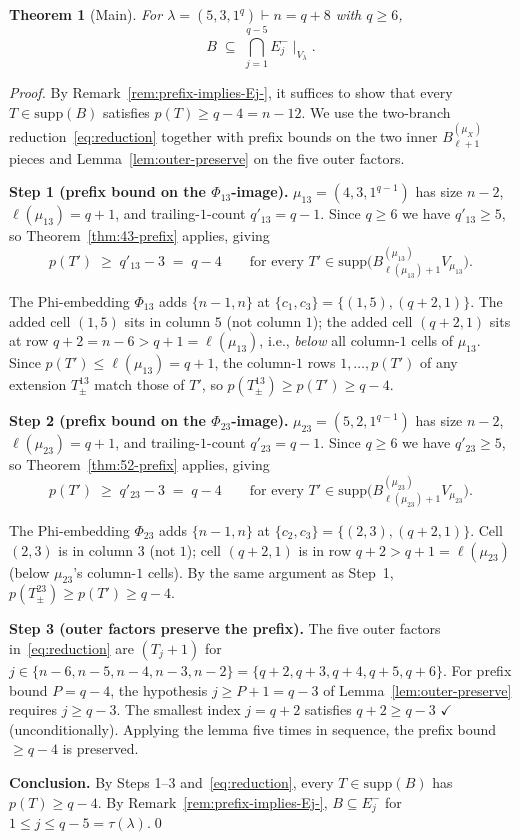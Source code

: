 \documentclass[11pt]{article}
\newtheorem{theorem}{Theorem}
\theoremstyle{definition}
\newcommand{\supp}{\mathrm{supp}}
\begin{document}
\begin{theorem}[Main]\label{thm:main}
For $\lambda = (5, 3, 1^q) \vdash n = q + 8$ with $q \ge 6$,
\[
   B \;\subseteq\; \bigcap_{j=1}^{q-5} E_j^-\!\mid_{V_\lambda}.
\]
\end{theorem}

\begin{proof}
By Remark~\ref{rem:prefix-implies-Ej-}, it suffices to show that every
$T \in \supp(B)$ satisfies $p(T) \ge q - 4 = n - 12$.  We use the
two-branch reduction~\eqref{eq:reduction} together with prefix bounds
on the two inner $B^{(\mu_X)}_{\ell+1}$ pieces and
Lemma~\ref{lem:outer-preserve} on the five outer factors.

\medskip\textbf{Step 1 (prefix bound on the $\Phi_{13}$-image).}
$\mu_{13} = (4, 3, 1^{q-1})$ has size $n - 2$, $\ell(\mu_{13}) =
q + 1$, and trailing-$1$-count $q'_{13} = q - 1$.  Since $q \ge 6$ we
have $q'_{13} \ge 5$, so Theorem~\ref{thm:43-prefix} applies, giving
\[
   p(T') \;\ge\; q'_{13} - 3 \;=\; q - 4
   \qquad \text{for every }
   T' \in \supp\bigl(B^{(\mu_{13})}_{\ell(\mu_{13})+1} V_{\mu_{13}}\bigr).
\]

The Phi-embedding $\Phi_{13}$ adds $\{n-1, n\}$ at $\{c_1, c_3\} =
\{(1, 5), (q+2, 1)\}$.  The added cell $(1, 5)$ sits in column $5$
(not column $1$); the added cell $(q+2, 1)$ sits at row $q + 2 = n - 6
> q + 1 = \ell(\mu_{13})$, i.e., \emph{below} all column-$1$ cells of
$\mu_{13}$.  Since $p(T') \le \ell(\mu_{13}) = q + 1$, the column-$1$
rows $1, \ldots, p(T')$ of any extension $T^{13}_\pm$ match those of
$T'$, so $p(T^{13}_\pm) \ge p(T') \ge q - 4$.

\medskip\textbf{Step 2 (prefix bound on the $\Phi_{23}$-image).}
$\mu_{23} = (5, 2, 1^{q-1})$ has size $n - 2$, $\ell(\mu_{23}) =
q + 1$, and trailing-$1$-count $q'_{23} = q - 1$.  Since $q \ge 6$ we
have $q'_{23} \ge 5$, so Theorem~\ref{thm:52-prefix} applies, giving
\[
   p(T') \;\ge\; q'_{23} - 3 \;=\; q - 4
   \qquad \text{for every }
   T' \in \supp\bigl(B^{(\mu_{23})}_{\ell(\mu_{23})+1} V_{\mu_{23}}\bigr).
\]

The Phi-embedding $\Phi_{23}$ adds $\{n-1, n\}$ at $\{c_2, c_3\} =
\{(2, 3), (q+2, 1)\}$.  Cell $(2, 3)$ is in column $3$ (not $1$); cell
$(q+2, 1)$ is in row $q + 2 > q + 1 = \ell(\mu_{23})$ (below
$\mu_{23}$'s column-$1$ cells).  By the same argument as Step~1,
$p(T^{23}_\pm) \ge p(T') \ge q - 4$.

\medskip\textbf{Step 3 (outer factors preserve the prefix).}
The five outer factors in~\eqref{eq:reduction} are $(T_j{+}1)$ for
$j \in \{n-6, n-5, n-4, n-3, n-2\} = \{q+2, q+3, q+4, q+5, q+6\}$.
For prefix bound $P = q - 4$, the hypothesis $j \ge P + 1 = q - 3$ of
Lemma~\ref{lem:outer-preserve} requires $j \ge q - 3$.  The smallest
index $j = q + 2$ satisfies $q + 2 \ge q - 3$ $\checkmark$
(unconditionally).  Applying the lemma five times in sequence, the
prefix bound $\ge q - 4$ is preserved.

\medskip\textbf{Conclusion.}  By Steps 1--3 and~\eqref{eq:reduction},
every $T \in \supp(B)$ has $p(T) \ge q - 4$.  By
Remark~\ref{rem:prefix-implies-Ej-}, $B \subseteq E_j^-$ for $1 \le
j \le q - 5 = \tau(\lambda)$.\qed
\end{proof}
\end{document}

